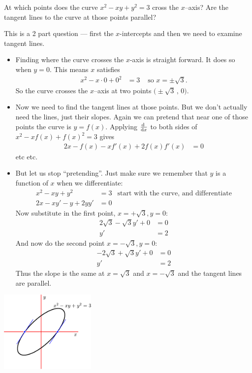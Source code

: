 \begin{eg}\label{eg:DIFFimpldiffE}
At which points does the curve  $x^2-xy+y^2=3$ cross the $x$--axis? Are the
tangent lines to the curve at those points parallel?

This is a 2 part question --- first the $x$-intercepts and then we need to
examine  tangent lines.
\begin{itemize}
 \item Finding where the curve crosses the $x$-axis is straight forward. It
does so when $y=0$. This means $x$ satisfies
\begin{align*}
  x^2-x\cdot 0+0^2&=3 & \text{ so $x = \pm\sqrt{3}$}.
\end{align*}
So the curve crosses the $x$--axis at two points $\big(\pm\sqrt{3}\,,\,0\big)$.
\item Now we need to find the tangent lines at those points. But we don't
actually need the lines, just their slopes. Again we can pretend that near one
of those points the curve is $y=f(x)$. Applying $\diff{}{x}$ to both sides of
$x^2-xf(x)+f(x)^2=3$ gives
\begin{align*}
  2x-f(x)-xf'(x)+2f(x)f'(x)&=0
\end{align*}
etc etc.

\item But let us stop ``pretending''. Just make sure we remember that $y$ is a
function of $x$ when we differentiate:
\begin{align*}
  x^2-xy+y^2 &= 3 & \text{start with the curve, and differentiate}\\
  2x - xy' -y + 2yy' &=0 &
\end{align*}
Now substitute in the first point, $x=+\sqrt{3}, y=0$:
\begin{align*}
  2\sqrt{3} - \sqrt{3}y' + 0 &=0 \\
  y' &= 2
\end{align*}
And now do the second point $x=-\sqrt{3}, y=0$:
\begin{align*}
  -2\sqrt{3} + \sqrt{3}y' + 0 &=0 \\
  y' &= 2
\end{align*}
Thus the slope is the same at $x=\sqrt{3}$ and $x=-\sqrt{3}$ and the tangent
lines are parallel.
\end{itemize}
\begin{efig}
 \begin{center}
  \includegraphics[height=4cm]{implicit_eg1}
 \end{center}
\end{efig}

\end{eg}

